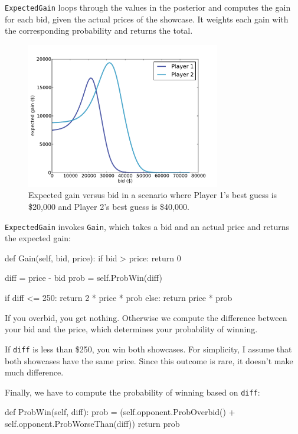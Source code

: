 \documentclass[12pt]{book}
\theoremstyle{exercise}
\begin{document}
{\tt ExpectedGain} loops through the values in the posterior
and computes the gain for each bid, given the actual prices of
the showcase.  It weights each gain with the corresponding
probability and returns the total.

\begin{figure}
\centerline{\includegraphics[height=2.5in]{figs/price5.pdf}}
\caption{Expected gain versus bid in a scenario where Player 1's best 
guess is \$20,000 and Player 2's best guess is \$40,000.}
\label{fig.price5}
\end{figure}

{\tt ExpectedGain} invokes {\tt Gain}, which takes a bid and an actual
price and returns the expected gain:

\begin{code}
    def Gain(self, bid, price):
        if bid > price:
            return 0

        diff = price - bid
        prob = self.ProbWin(diff)

        if diff <= 250:
            return 2 * price * prob
        else:
            return price * prob
\end{code}

If you overbid, you get nothing.  Otherwise we compute 
the difference between your bid and the price, which determines
your probability of winning.

If {\tt diff} is less than \$250, you win both showcases.  For
simplicity, I assume that both showcases have the same price.  Since
this outcome is rare, it doesn't make much difference.

Finally, we have to compute the probability of winning based
on {\tt diff}:

\begin{code}
    def ProbWin(self, diff):
        prob = (self.opponent.ProbOverbid() + 
                self.opponent.ProbWorseThan(diff))
        return prob
\end{code}
\end{document}
